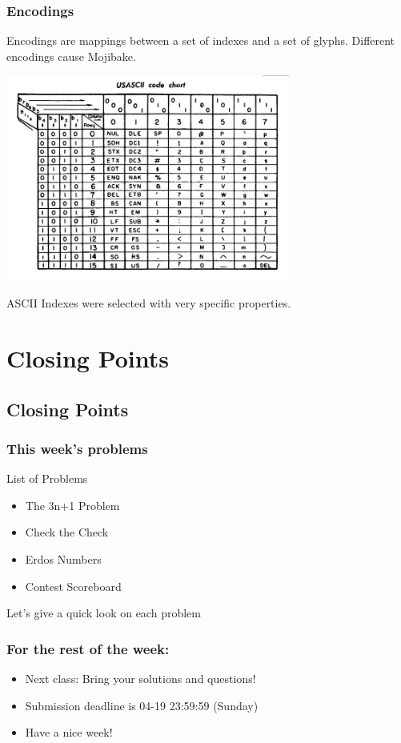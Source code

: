 \documentclass{beamer}
\begin{document}
\begin{frame}
  \frametitle{Encodings}
  \begin{block}{}
    Encodings are mappings between a set of indexes and a set of
    glyphs. Different encodings cause Mojibake.
  \end{block}

  \medskip

  \includegraphics[width=0.7\textwidth]{img/ASCIItableOld}

  \medskip

  ASCII Indexes were selected with very specific properties.
  
\end{frame}


\section{Closing Points}
\subsection{Closing Points}
\begin{frame}
  \frametitle{This week's problems}
  \begin{block}{List of Problems}
    \begin{itemize}
    \item The 3n+1 Problem
    \item Check the Check
    \item Erdos Numbers
    \item Contest Scoreboard
    \end{itemize}
  \end{block}
  \medskip
  Let's give a quick look on each problem
\end{frame}

\begin{frame}
  \frametitle{For the rest of the week:}
  \begin{itemize}
  \item Next class: Bring your solutions and questions!
    \vfill
  \item Submission deadline is 04-19 23:59:59 (Sunday)
    \vfill
  \item Have a nice week!
  \end{itemize}
\end{frame}
\end{document}
